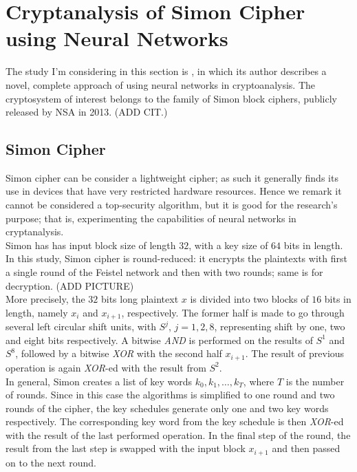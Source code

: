 \documentclass[%
    corpo=11pt,
    twoside,
    stile=classica,
    oldstyle,
    autoretitolo,
    tipotesi=magistrale,
    greek,
    evenboxes,
    english
]{toptesi}
\begin{document}
\section{Cryptanalysis of Simon Cipher using Neural Networks}
The study I'm considering in this section is \cite{jay}, in which its author describes a novel, complete approach of using neural networks in cryptoanalysis. The cryptosystem of interest belongs to the family of Simon block ciphers, publicly released by NSA in 2013. (ADD CIT.)  
\subsection{Simon Cipher}
Simon cipher can be consider a lightweight cipher; as such it generally finds its use in devices that have very restricted hardware resources. Hence we remark it cannot be considered a top-security algorithm, but it is good for the research's purpose; that is, experimenting the capabilities of neural networks in cryptanalysis. \\
Simon has has input block size of length $32$, with a key size of $64$ bits in length. In this study, Simon cipher is round-reduced: it encrypts the plaintexts with first a single round of the Feistel network and then with two rounds; same is for decryption. (ADD PICTURE)\\
More precisely, the $32$ bits long plaintext $x$ is divided into two blocks of $16$ bits in length, namely $x_i$ and $x_{i+1}$, respectively. The former half is made to go through several left circular shift units, with $S^j$, $j = 1,2,8$, representing shift by one, two and eight bits respectively. A bitwise \textit{AND} is performed on the results of $S^1$ and $S^8$, followed by a bitwise \textit{XOR} with the second half $x_{i+1}$. The result of previous operation is again \textit{XOR}-ed with the result from $S^2$. \\
In general, Simon creates a list of key words $k_0, k_1, \dots, k_T$, where $T$ is the number of rounds. Since in this case the algorithms is simplified to one round and two rounds of the cipher, the key schedules generate only one and two key words respectively. The corresponding key word from the key schedule is then \textit{XOR}-ed with the result of the last performed operation. In the final step of the round, the result from the last step is swapped with the input block $x_{i+1}$ and then passed on to the next round.
\end{document}
